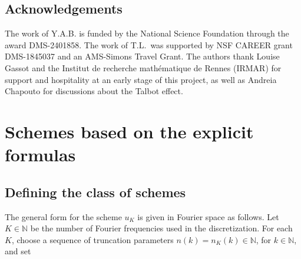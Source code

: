 \documentclass [11pt] {article}
\newcommand{\<}{\langle}
\renewcommand{\>}{\rangle}
\begin{document}
\subsection*{Acknowledgements} The work of Y.A.B. is funded by the National Science Foundation through the award
DMS-2401858. The work of T.L.\ was supported by NSF CAREER grant DMS-1845037 and an AMS-Simons Travel Grant.  The authors thank  Louise Gassot and the Institut de recherche mathématique de Rennes (IRMAR) for support and hospitality at an early stage of this project, as well as Andreia Chapouto for discussions about the Talbot effect. 

\section{Schemes based on the explicit formulas}\label{sec:schemes}
\subsection{Defining the class of schemes}\label{sec:defschemes} 
The general form for the scheme $u_K$ is given in Fourier space as follows.
Let $K\in \mathbb{N}$ be the number of Fourier frequencies used in the discretization.
For each $K$, choose a sequence of truncation parameters $n(k) = n_K(k) \in \mathbb{N}$, for $k\in\mathbb{N}$, and set
\end{document}
